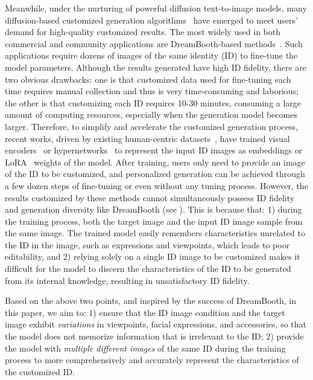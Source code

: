 Meanwhile, under the nurturing of powerful diffusion text-to-image models, many diffusion-based customized generation algorithms~\cite{ruiz2022dreambooth, gal2022image} have emerged to meet users' demand for high-quality customized results.
The most widely used in both commercial and community applications are DreamBooth-based methods~\cite{ruiz2022dreambooth, db_lora}.
Such applications require dozens of images of the same identity (ID) to fine-tune the model parameters.
Although the results generated have high ID fidelity, there are two obvious drawbacks: one is that customized data used for fine-tuning each time requires manual collection and thus is very time-consuming and laborious; the other is that customizing each ID requires 10-30 minutes, consuming a large amount of computing resources, especially when the generation model becomes larger.
Therefore, to simplify and accelerate the customized generation process, recent works, driven by existing human-centric datasets~\cite{liu2015faceattributes,karras2019style}, have trained visual encoders~\cite{xiao2023fastcomposer, chen2023photoverse} or hypernetworks~\cite{ruiz2023hyperdreambooth, arar2023domain} to represent the input ID images as embeddings or LoRA~\cite{hu2021lora} weights of the model.
After training, users only need to provide an image of the ID to be customized, and personalized generation can be achieved through a few dozen steps of fine-tuning or even without any tuning process.
However, the results customized by these methods cannot simultaneously possess ID fidelity and generation diversity like DreamBooth (see ). This is because that: 1) during the training process, both the target image and the input ID image sample from the same image. The trained model easily remembers characteristics unrelated to the ID in the image, such as expressions and viewpoints, which leads to poor editability, and 2) relying solely on a single ID image to be customized makes it difficult for the model to discern the characteristics of the ID to be generated from its internal knowledge, resulting in unsatisfactory ID fidelity.

Based on the above two points, and inspired by the success of DreamBooth, in this paper, we aim to:
1) ensure that the ID image condition and the target image exhibit \textit{variations} in viewpoints, facial expressions, and accessories, so that the model does not memorize information that is irrelevant to the ID;
2) provide the model with \textit{multiple different images} of the same ID during the training process to more comprehensively and accurately represent the characteristics of the customized ID.

